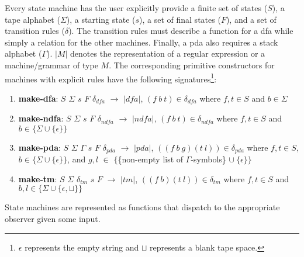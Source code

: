 \documentclass{eptcs}
\begin{document}
Every state machine has the user explicitly provide a finite set of states ($S$), a tape alphabet ($\Sigma$), a starting state ($s$), a set of final states ($F$), and a set of transition rules ($\delta$). The transition rules must describe a function for a \textsf{dfa} while simply a relation for the other machines. Finally, a \textsf{pda} also requires a stack alphabet ($\Gamma$). $|M|$ denotes the representation of a regular expression or a machine/grammar of type $M$. The corresponding primitive constructors for machines with explicit rules have the following signatures\footnote{$\epsilon$ represents the empty string and $\sqcup$ represents a blank tape space.}:
\begin{enumerate}
   \item \textbf{make-dfa}: $S$ $\Sigma$ $s$ $F$ $\delta_{\mathit{dfa}}$ $\rightarrow$ $\mathit{|dfa|}$, \newline $( f \ b  \ t) \in \delta_{\mathit{dfa}}$ where $f, t \in S$ and $b \in \Sigma $
   \item \textbf{make-ndfa}: $S$ $\Sigma$ $s$ $F$ $\delta_{\mathit{ndfa}}$ $\rightarrow$ $\mathit{|ndfa|}$, \newline $( f \ b  \ t) \in \delta_{\mathit{ndfa}}$ where $f, t \in S$ and $b \in \{\Sigma \cup \{\epsilon\}\}$
   \item \textbf{make-pda}: $S$ $\Sigma$ $\Gamma$ $s$ $F$ $\delta_{\mathit{pda}}$ $\rightarrow$ $\mathit{|pda|}$, \newline $((f \ b  \ g) (t \ l)) \in \delta_{\mathit{pda}}$ where $f, t \in S$, $b \in \{\Sigma \cup \{\epsilon\}\}$, and \newline $g, l$ $\in$ $\{$\{non-empty list of $\Gamma$-symbols\} $\cup \ \{\epsilon\}\}$
   \item \textbf{make-tm}: $S$ $\Sigma$ $\delta_{\mathit{tm}}$ $s$ $F$ $\rightarrow$ $\mathit{|tm|}$, \newline $((f \ b) (t \ l)) \in \delta_{\mathit{tm}}$ where $f, t \in S$ and $b, l \in \{\Sigma \cup \{\epsilon, \sqcup\}\}$
\end{enumerate}
State machines are represented as functions that dispatch to the appropriate observer given some input.
\end{document}
